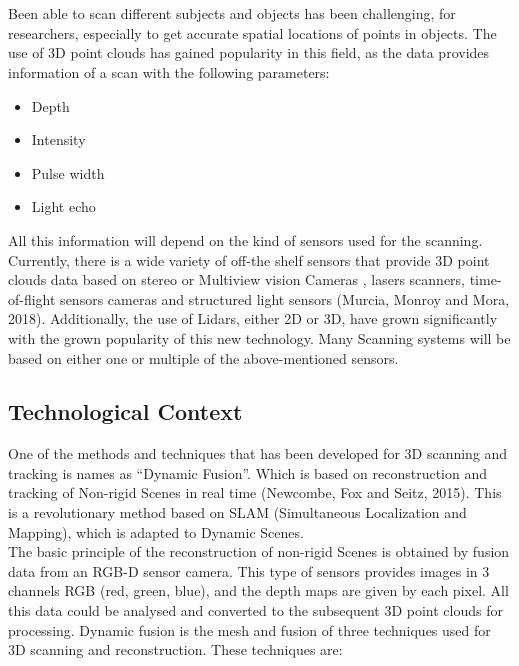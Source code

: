\documentclass[a4paper]{article}
\begin{document}
\section*{}
Been able to scan different subjects and objects has been challenging, for researchers, especially to get accurate spatial locations of points in objects. The use of 3D point clouds has gained popularity in this field, as the data provides information of a scan with the following parameters: 
\begin{itemize}[]
    \itemsep0em 
    \item Depth
    \item Intensity
    \item Pulse width
    \item Light echo
\end{itemize}
All this information will depend on the kind of sensors used for the scanning. Currently, there is a wide variety of off-the shelf sensors that provide 3D point clouds data based on stereo or Multiview vision Cameras , lasers scanners, time-of-flight sensors cameras and structured light sensors (Murcia, Monroy and Mora, 2018). 
Additionally, the use of Lidars, either 2D or 3D, have grown significantly with the grown popularity of this new technology.
Many Scanning systems will be based on either one or multiple of the above-mentioned sensors. 

\subsection*{Technological Context}
One of the methods and techniques that has been developed for 3D scanning and tracking is names as “Dynamic Fusion”. Which is based on reconstruction and tracking of Non-rigid Scenes in real time (Newcombe, Fox and Seitz, 2015).
This is a revolutionary method based on SLAM (Simultaneous Localization and Mapping), which is adapted to Dynamic Scenes.\\[10pt]
The basic principle of the reconstruction of non-rigid Scenes is obtained by fusion data from an RGB-D sensor camera.
This type of sensors provides images in 3 channels RGB (red, green, blue), and the depth maps are given by each pixel. 
All this data could be analysed and converted to the subsequent 3D point clouds for processing.
Dynamic fusion is the mesh and fusion of three techniques used for 3D scanning and reconstruction.  These techniques are:
\end{document}
